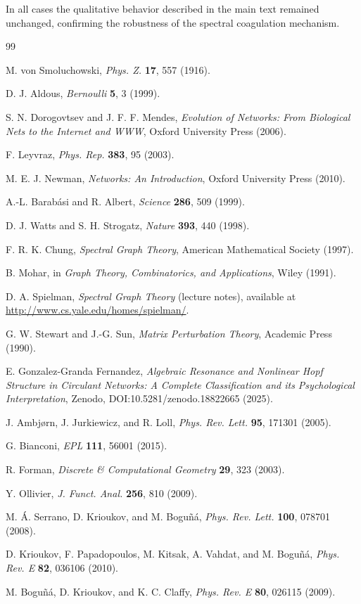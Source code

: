 \documentclass[11pt]{article}
\begin{document}
In all cases the qualitative behavior described in the main text remained unchanged, confirming the robustness of the spectral coagulation mechanism.

\begin{thebibliography}{99}

M. von Smoluchowski,
\emph{Phys. Z.} \textbf{17}, 557 (1916).

D. J. Aldous,
\emph{Bernoulli} \textbf{5}, 3 (1999).

S. N. Dorogovtsev and J. F. F. Mendes,
\emph{Evolution of Networks: From Biological Nets to the Internet and WWW},
Oxford University Press (2006).

F. Leyvraz,
\emph{Phys. Rep.} \textbf{383}, 95 (2003).

M. E. J. Newman,
\emph{Networks: An Introduction},
Oxford University Press (2010).

A.-L. Barabási and R. Albert,
\emph{Science} \textbf{286}, 509 (1999).

D. J. Watts and S. H. Strogatz,
\emph{Nature} \textbf{393}, 440 (1998).

F. R. K. Chung,
\emph{Spectral Graph Theory},
American Mathematical Society (1997).

B. Mohar,
in \emph{Graph Theory, Combinatorics, and Applications}, Wiley (1991).

D. A. Spielman,
\emph{Spectral Graph Theory} (lecture notes),
available at \url{http://www.cs.yale.edu/homes/spielman/}.

G. W. Stewart and J.-G. Sun,
\emph{Matrix Perturbation Theory},
Academic Press (1990).

E. Gonzalez-Granda Fernandez,
\emph{Algebraic Resonance and Nonlinear Hopf Structure in Circulant Networks: A Complete Classification and its Psychological Interpretation},
Zenodo, DOI:10.5281/zenodo.18822665 (2025).

J. Ambjørn, J. Jurkiewicz, and R. Loll,
\emph{Phys. Rev. Lett.} \textbf{95}, 171301 (2005).

G. Bianconi,
\emph{EPL} \textbf{111}, 56001 (2015).

R. Forman,
\emph{Discrete \& Computational Geometry} \textbf{29}, 323 (2003).

Y. Ollivier,
\emph{J. Funct. Anal.} \textbf{256}, 810 (2009).

M. Á. Serrano, D. Krioukov, and M. Boguñá,
\emph{Phys. Rev. Lett.} \textbf{100}, 078701 (2008).

D. Krioukov, F. Papadopoulos, M. Kitsak, A. Vahdat, and M. Boguñá,
\emph{Phys. Rev. E} \textbf{82}, 036106 (2010).

M. Boguñá, D. Krioukov, and K. C. Claffy,
\emph{Phys. Rev. E} \textbf{80}, 026115 (2009).

\end{thebibliography}
\end{document}
